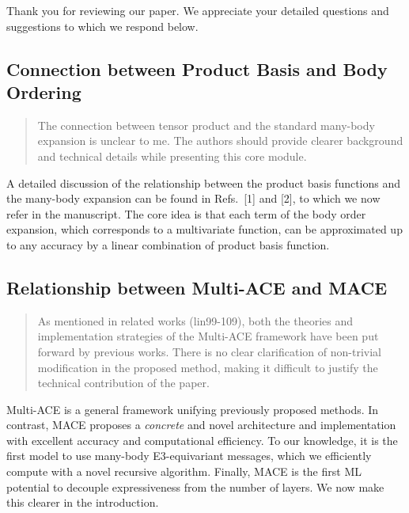\documentclass{article}
\begin{document}
Thank you for reviewing our paper.
We appreciate your detailed questions and suggestions to which we respond below.

\subsection*{Connection between Product Basis and Body Ordering} 

\begin{quote}
The connection between tensor product and the standard many-body expansion is unclear to me. The authors should provide clearer background and technical details while presenting this core module.
\end{quote}

A detailed discussion of the relationship between the product basis functions and the many-body expansion can be found in Refs.~[1] and [2], to which we now refer in the manuscript.
The core idea is that each term of the body order expansion, which corresponds to a multivariate function, can be approximated up to any accuracy by a linear combination of product basis function. 

\subsection*{Relationship between Multi-ACE and MACE}

\begin{quote}
As mentioned in related works (lin99-109), both the theories and implementation strategies of the Multi-ACE framework have been put forward by previous works. There is no clear clarification of non-trivial modification in the proposed method, making it difficult to justify the technical contribution of the paper.
\end{quote}
Multi-ACE is a general framework unifying previously proposed methods. 
In contrast, MACE proposes a \emph{concrete} and novel architecture and implementation with excellent accuracy and computational efficiency.
To our knowledge, it is the first model to use many-body E3-equivariant messages,
which we efficiently compute with a novel recursive algorithm.
Finally, MACE is the first ML potential to decouple expressiveness from the number of layers. 
We now make this clearer in the introduction.
\end{document}
